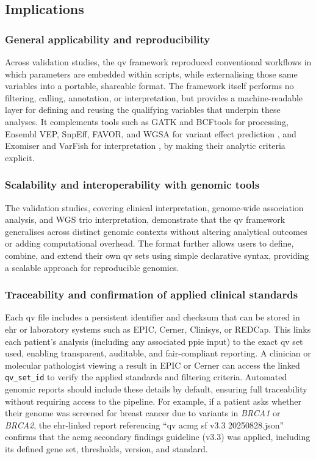 \subsection{Implications}
\subsubsection*{General applicability and reproducibility}
Across validation studies, the \ac{qv} framework reproduced conventional workflows in which parameters are embedded within scripts, while externalising those same variables into a portable, shareable format. The framework itself performs no filtering, calling, annotation, or interpretation, but provides a machine-readable layer for defining and reusing the qualifying variables that underpin these analyses. It complements tools such as GATK and BCFtools for processing, Ensembl VEP, SnpEff, FAVOR, and WGSA for variant effect prediction \cite{2024riccioVariantEffectPredictors}, and Exomiser and VarFish for interpretation \cite{2020ciprianiImprovedPhenotypeDrivenTool, 2020holtgreweVarFishComprehensiveDNA}, by making their analytic criteria explicit.

\subsubsection*{Scalability and interoperability with genomic tools}
The validation studies, covering clinical interpretation, genome-wide association analysis, and WGS trio interpretation, demonstrate that the \ac{qv} framework generalises across distinct genomic contexts without altering analytical outcomes or adding computational overhead. The format further allows users to define, combine, and extend their own \ac{qv} sets using simple declarative syntax, providing a scalable approach for reproducible genomics.

\subsubsection*{Traceability and confirmation of applied clinical standards}
Each \ac{qv} file includes a persistent identifier and checksum that can be stored in \ac{ehr} or laboratory systems such as EPIC, Cerner, Clinisys, or REDCap. This links each patient’s analysis (including any associated \ac{ppie} input) to the exact \ac{qv} set used, enabling transparent, auditable, and \ac{fair}-compliant reporting.  
A clinician or molecular pathologist viewing a result in EPIC or Cerner can access the linked \texttt{qv\_set\_id} to verify the applied standards and filtering criteria. Automated genomic reports should include these details by default, ensuring full traceability without requiring access to the pipeline.  
For example, if a patient asks whether their genome was screened for breast cancer due to variants in \textit{BRCA1} or \textit{BRCA2}, the \ac{ehr}-linked report referencing ``qv acmg sf v3.3 20250828.json'' confirms that the \ac{acmg} secondary findings guideline (v3.3) \cite{miller2023acmg} was applied, including its defined gene set, thresholds, version, and standard.  

